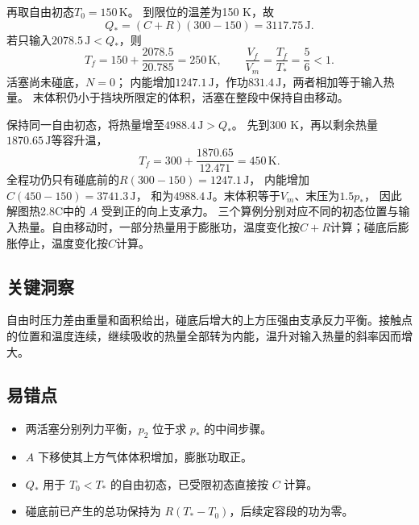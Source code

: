 \documentclass[UTF8,fontset=fandol,a4paper,11pt]{ctexart}
\begin{document}
再取自由初态$T_0=150\,\mathrm K$。
到限位的温差为150 K，故
\[
Q_*=(C+R)(300-150)=3117.75\,\mathrm J.
\]
若只输入$2078.5\,\mathrm J<Q_*$，则
\[
T_f=150+\frac{2078.5}{20.785}=250\,\mathrm K,\qquad
\frac{V_f}{V_m}=\frac{T_f}{T_*}=\frac56<1.
\]
活塞尚未碰底，$N=0$；
内能增加$1247.1\,\mathrm J$，作功$831.4\,\mathrm J$，两者相加等于输入热量。
末体积仍小于挡块所限定的体积，活塞在整段中保持自由移动。

保持同一自由初态，将热量增至$4988.4\,\mathrm J>Q_*$。
先到300 K，再以剩余热量$1870.65\,\mathrm J$等容升温，
\[
T_f=300+\frac{1870.65}{12.471}=450\,\mathrm K.
\]
全程功仍只有碰底前的$R(300-150)=1247.1\,\mathrm J$，
内能增加$C(450-150)=3741.3\,\mathrm J$，
和为$4988.4\,\mathrm J$。末体积等于$V_m$、末压为$1.5p_*$，
因此解图热2.8C中的 $A$ 受到正的向上支承力。
三个算例分别对应不同的初态位置与输入热量。自由移动时，一部分热量用于膨胀功，温度变化按$C+R$计算；碰底后膨胀停止，温度变化按$C$计算。





\subsection*{关键洞察}

自由时压力差由重量和面积给出，碰底后增大的上方压强由支承反力平衡。接触点的位置和温度连续，继续吸收的热量全部转为内能，温升对输入热量的斜率因而增大。



\subsection*{易错点}

\begin{itemize}
\item 两活塞分别列力平衡，$p_2$ 位于求 $p_*$ 的中间步骤。
\item $A$ 下移使其上方气体体积增加，膨胀功取正。
\item $Q_*$ 用于 $T_0<T_*$ 的自由初态，已受限初态直接按 $C$ 计算。
\item 碰底前已产生的总功保持为 $R(T_*-T_0)$，后续定容段的功为零。
\end{itemize}


\end{document}

